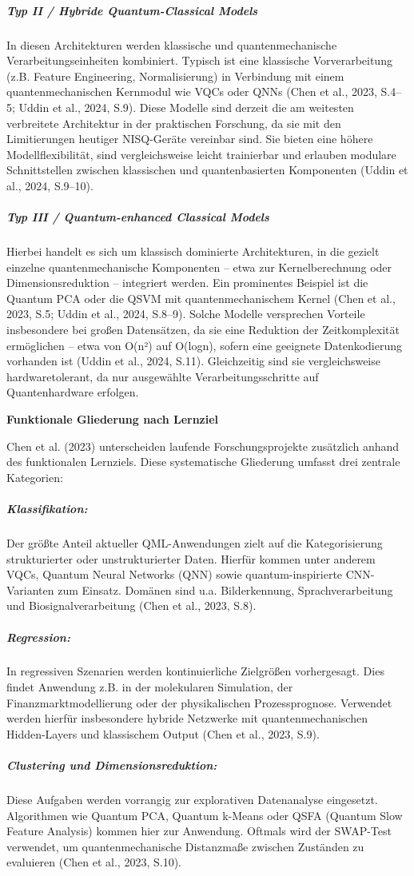 \subparagraph{Typ II / Hybride Quantum-Classical Models}
In diesen Architekturen werden klassische und quantenmechanische Verarbeitungseinheiten kombiniert. Typisch ist eine klassische Vorverarbeitung (z.B. Feature Engineering, Normalisierung) in Verbindung mit einem quantenmechanischen Kernmodul wie VQCs oder QNNs (Chen et al., 2023, S.4–5; Uddin et al., 2024, S.9).
Diese Modelle sind derzeit die am weitesten verbreitete Architektur in der praktischen Forschung, da sie mit den Limitierungen heutiger NISQ-Geräte vereinbar sind. Sie bieten eine höhere Modellflexibilität, sind vergleichsweise leicht trainierbar und erlauben modulare Schnittstellen zwischen klassischen und quantenbasierten Komponenten (Uddin et al., 2024, S.9–10).

\subparagraph{ Typ III / Quantum-enhanced Classical Models}
Hierbei handelt es sich um klassisch dominierte Architekturen, in die gezielt einzelne quantenmechanische Komponenten – etwa zur Kernelberechnung oder Dimensionsreduktion – integriert werden. Ein prominentes Beispiel ist die Quantum PCA oder die QSVM mit quantenmechanischem Kernel (Chen et al., 2023, S.5; Uddin et al., 2024, S.8–9).
Solche Modelle versprechen Vorteile insbesondere bei großen Datensätzen, da sie eine Reduktion der Zeitkomplexität ermöglichen – etwa von O(n²) auf O(logn), sofern eine geeignete Datenkodierung vorhanden ist (Uddin et al., 2024, S.11). Gleichzeitig sind sie vergleichsweise hardwaretolerant, da nur ausgewählte Verarbeitungsschritte auf Quantenhardware erfolgen.


\vspace{1em}
\noindent\textbf{Funktionale Gliederung nach Lernziel}

\vspace{0.5em}
\noindent
Chen et al. (2023) unterscheiden laufende Forschungsprojekte zusätzlich anhand des funktionalen Lernziels. Diese systematische Gliederung umfasst drei zentrale Kategorien:
\subparagraph{Klassifikation:}
Der größte Anteil aktueller QML-Anwendungen zielt auf die Kategorisierung strukturierter oder unstrukturierter Daten. Hierfür kommen unter anderem VQCs, Quantum Neural Networks (QNN) sowie quantum-inspirierte CNN-Varianten zum Einsatz. Domänen sind u.a. Bilderkennung, Sprachverarbeitung und Biosignalverarbeitung (Chen et al., 2023, S.8).
\subparagraph{Regression:}
In regressiven Szenarien werden kontinuierliche Zielgrößen vorhergesagt. Dies findet Anwendung z.B. in der molekularen Simulation, der Finanzmarktmodellierung oder der physikalischen Prozessprognose. Verwendet werden hierfür insbesondere hybride Netzwerke mit quantenmechanischen Hidden-Layers und klassischem Output (Chen et al., 2023, S.9).
\subparagraph{Clustering und Dimensionsreduktion:}
Diese Aufgaben werden vorrangig zur explorativen Datenanalyse eingesetzt. Algorithmen wie Quantum PCA, Quantum k-Means oder QSFA (Quantum Slow Feature Analysis) kommen hier zur Anwendung. Oftmals wird der SWAP-Test verwendet, um quantenmechanische Distanzmaße zwischen Zuständen zu evaluieren (Chen et al., 2023, S.10).

